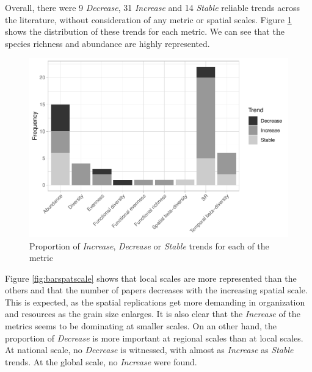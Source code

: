 \documentclass[
  12pt,
  oneside]{report}
\begin{document}
Overall, there were 9 \emph{Decrease}, 31 \emph{Increase} and 14 \emph{Stable} reliable trends across the literature, without consideration of any metric or spatial scales. Figure \ref{fig:barmetrics} shows the distribution of these trends for each metric. We can see that the species richness and abundance are highly represented.

\begin{figure}
\centering
\includegraphics{literature_review_files/figure-latex/barmetrics-1.pdf}
\caption{\label{fig:barmetrics}Proportion of \emph{Increase}, \emph{Decrease} or \emph{Stable} trends for each of the metric}
\end{figure}

Figure \ref{fig:barspatscale} shows that local scales are more represented than the others and that the number of papers decreases with the increasing spatial scale. This is expected, as the spatial replications get more demanding in organization and resources as the grain size enlarges. It is also clear that the \emph{Increase} of the metrics seems to be dominating at smaller scales. On an other hand, the proportion of \emph{Decrease} is more important at regional scales than at local scales. At national scale, no \emph{Decrease} is witnessed, with almost as \emph{Increase} as \emph{Stable} trends. At the global scale, no \emph{Increase} were found.
\end{document}
